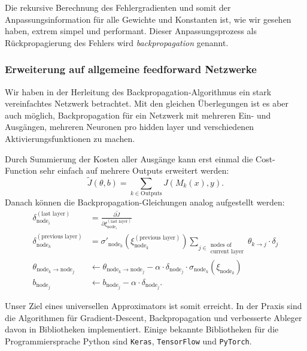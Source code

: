 Die rekursive Berechnung des Fehlergradienten und somit der Anpassungsinformation für alle
Gewichte und Konstanten ist, wie wir gesehen haben, extrem simpel und performant.
Dieser Anpassungsprozess als Rückpropagierung des Fehlers wird \emph{backpropagation} genannt.
%

\subsubsection{Erweiterung auf allgemeine feedforward Netzwerke}

Wir haben in der Herleitung des Backpropagation-Algorithmus ein stark vereinfachtes
Netzwerk betrachtet. Mit den gleichen Überlegungen ist es aber auch möglich,
Backpropagation für ein Netzwerk mit mehreren Ein- und Ausgängen, mehreren Neuronen pro
hidden layer und verschiedenen Aktivierungsfunktionen zu machen.

Durch Summierung der Kosten aller Ausgänge kann erst einmal die Cost-Function sehr einfach
auf mehrere Outputs erweitert werden:
\begin{equation}
    \tilde J(\theta, b) = \sum_{k\in \text{Outputs}} J(M_k(x), y).
\end{equation}
Danach können die Backpropagation-Gleichungen analog aufgestellt werden:
\begin{equation}
\begin{aligned}
    \delta_{\text{node}_i}^{(\text{last layer})} &=
        \frac{\partial \tilde J}{\partial \xi_{\text{node}_i}^{(\text{last layer})}} \\
    \delta_{\text{node}_k}^{(\text{previous layer})} &=
        \sigma'_{\text{node}_k} \left( \xi_{\text{node}_k}^{(\text{previous layer})} \right) 
        \sum_{j\in \substack{\text{nodes of}\\\text{current layer}}}
        \theta_{k\rightarrow j} \cdot \delta_j\\
    \theta_{\text{node}_k\rightarrow\text{node}_j} &\leftarrow
        \theta_{\text{node}_k\rightarrow\text{node}_j} -
        \alpha \cdot \delta_{\text{node}_j} \cdot \sigma_{\text{node}_k}(\xi_{\text{node}_k}) \\
    b_{\text{node}_j} &\leftarrow b_{\text{node}_j} - \alpha \cdot \delta_{\text{node}_j}.
\end{aligned}
\label{ml:ann:bp:update}
\end{equation}

\bigskip
Unser Ziel eines universellen Approximators ist somit erreicht. In der Praxis sind die
Algorithmen für Gradient-Descent, Backpropagation und verbesserte Ableger davon in
Bibliotheken implementiert. Einige bekannte Bibliotheken für die Programmiersprache Python
sind \texttt{Keras}, \texttt{TensorFlow} und \texttt{PyTorch}.
